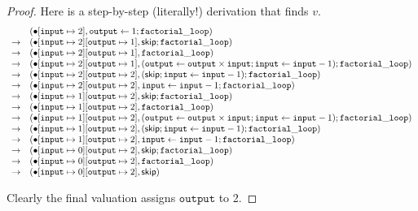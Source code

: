 \documentclass{amsbook}
\theoremstyle{definition}
\theoremstyle{remark}
\numberwithin{section}{chapter}
\numberwithin{equation}{chapter}
\begin{document}
\begin{proof}
  Here is a step-by-step (literally!) derivation that finds $v$.
  $$\begin{array}{cl}
    & (\bullet[\mathtt{input} \mapsto 2], \mathtt{output} \leftarrow 1; \mathtt{factorial\_loop}) \\
    \to & (\bullet[\mathtt{input} \mapsto 2][\mathtt{output} \mapsto 1], \mathsf{skip}; \mathtt{factorial\_loop}) \\
    \to & (\bullet[\mathtt{input} \mapsto 2][\mathtt{output} \mapsto 1], \mathtt{factorial\_loop}) \\
    \to & (\bullet[\mathtt{input} \mapsto 2][\mathtt{output} \mapsto 1], (\mathtt{output} \leftarrow \mathtt{output} \times \mathtt{input}; \mathtt{input} \leftarrow \mathtt{input} - 1); \mathtt{factorial\_loop}) \\
    \to & (\bullet[\mathtt{input} \mapsto 2][\mathtt{output} \mapsto 2], (\mathsf{skip}; \mathtt{input} \leftarrow \mathtt{input} - 1); \mathtt{factorial\_loop}) \\
    \to & (\bullet[\mathtt{input} \mapsto 2][\mathtt{output} \mapsto 2], \mathtt{input} \leftarrow \mathtt{input} - 1; \mathtt{factorial\_loop}) \\
    \to & (\bullet[\mathtt{input} \mapsto 1][\mathtt{output} \mapsto 2], \mathsf{skip}; \mathtt{factorial\_loop}) \\
    \to & (\bullet[\mathtt{input} \mapsto 1][\mathtt{output} \mapsto 2], \mathtt{factorial\_loop}) \\
    \to & (\bullet[\mathtt{input} \mapsto 1][\mathtt{output} \mapsto 2], (\mathtt{output} \leftarrow \mathtt{output} \times \mathtt{input}; \mathtt{input} \leftarrow \mathtt{input} - 1); \mathtt{factorial\_loop}) \\
    \to & (\bullet[\mathtt{input} \mapsto 1][\mathtt{output} \mapsto 2], (\mathsf{skip}; \mathtt{input} \leftarrow \mathtt{input} - 1); \mathtt{factorial\_loop}) \\
    \to & (\bullet[\mathtt{input} \mapsto 1][\mathtt{output} \mapsto 2], \mathtt{input} \leftarrow \mathtt{input} - 1; \mathtt{factorial\_loop}) \\
    \to & (\bullet[\mathtt{input} \mapsto 0][\mathtt{output} \mapsto 2], \mathsf{skip}; \mathtt{factorial\_loop}) \\
    \to & (\bullet[\mathtt{input} \mapsto 0][\mathtt{output} \mapsto 2], \mathtt{factorial\_loop}) \\
    \to & (\bullet[\mathtt{input} \mapsto 0][\mathtt{output} \mapsto 2], \mathsf{skip})
  \end{array}$$

  Clearly the final valuation assigns $\mathtt{output}$ to 2.
\end{proof}
\end{document}
